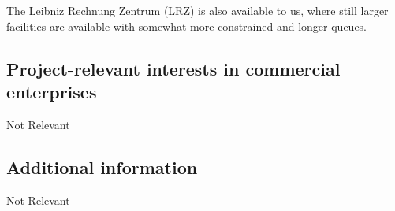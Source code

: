 \documentclass[10pt,fleqn,twoside]{article}
\newcommand{\Tcol}{\color{blue}}
\begin{document}
The Leibniz Rechnung Zentrum (LRZ) is also available to us, where still
larger facilities are available with somewhat more constrained and longer queues.

\subsection{\Tcol Project-relevant interests in commercial enterprises}

Not Relevant


\subsection{\Tcol Additional information}

Not Relevant
\end{document}
